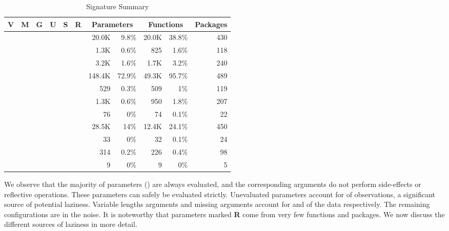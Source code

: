 \documentclass[screen,acmsmall]{acmart}
\newcommand{\xmark}{\textcolor{red}{\ding{55}}}
\newcommand{\cmark}{\textcolor{green}{\ding{51}}}
\begin{document}
\begin{table}[!h] \small
  \caption{Signature Summary} \label{table:strictdist} \centering
  \begin{tabular}{ccccccrrrrr}\toprule
    \bf V&\bf M&\bf G&\bf U&\bf S&\bf R&\multicolumn{2}{c}{\textbf{Parameters}} &\multicolumn{2}{c}{\textbf{Functions}}&\bf Packages\\\midrule
    \cmark{}&\xmark{}&\xmark{}&\xmark{}&\xmark{}&\xmark{}&20.0K&9.8\%&20.0K&38.8\%&430\\
    \xmark{}&\cmark{}&\xmark{}&\xmark{}&\xmark{}&\xmark{}&1.3K&0.6\%&825&1.6\%&118\\
    \xmark{}&\xmark{}&\cmark{}&\xmark{}&\xmark{}&\xmark{}&3.2K&1.6\%&1.7K&3.2\%&240\\
    \xmark{}&\xmark{}&\xmark{}&\xmark{}&\xmark{}&\xmark{}&148.4K&72.9\%&49.3K&95.7\%&489\\
    \xmark{}&\xmark{}&\xmark{}&\xmark{}&\xmark{}&\cmark{}&529&0.3\%&509&1\%&119\\
    \xmark{}&\xmark{}&\xmark{}&\xmark{}&\cmark{}&\xmark{}&1.3K&0.6\%&950&1.8\%&207\\
    \xmark{}&\xmark{}&\xmark{}&\xmark{}&\cmark{}&\cmark{}&76&0\%&74&0.1\%&22\\
    \xmark{}&\xmark{}&\xmark{}&\cmark{}&\xmark{}&\xmark{}&28.5K&14\%&12.4K&24.1\%&450\\
    \xmark{}&\xmark{}&\xmark{}&\cmark{}&\xmark{}&\cmark{}&33&0\%&32&0.1\%&24\\
    \xmark{}&\xmark{}&\xmark{}&\cmark{}&\cmark{}&\xmark{}&314&0.2\%&226&0.4\%&98\\
    \xmark{}&\xmark{}&\xmark{}&\cmark{}&\cmark{}&\cmark{}&9&0\%&9&0\%&5\\
    \bottomrule
  \end{tabular}
\end{table}

We observe that the majority of parameters (\TotalStrictParamPerc) are always
evaluated, and the corresponding arguments do not perform side-effects or
reflective operations. These parameters can safely be evaluated strictly.
Unevaluated parameters account for \TotalUnevaluatedParamPerc of observations, a
significant source of potential laziness. Variable lengths arguments and missing
arguments account for \TotalVarargParamPerc and \TotalMissingParamPerc of the
data respectively. The remaining configurations are in the noise. It is
noteworthy that parameters marked \textbf{R} come from very few functions and
packages. We now discuss the different sources of laziness in more detail.
\end{document}

